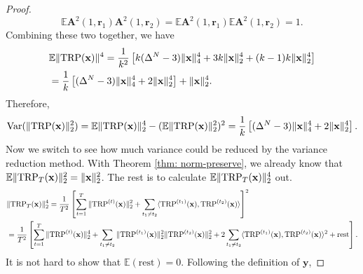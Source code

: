\begin{proof}
\[
\mathbb{E} \mathbf{A}^2(1,\mathbf{r}_1)\mathbf{A}^2(1,\mathbf{r}_2) = \mathbb{E} \mathbf{A}^2(1,\mathbf{r}_1) \mathbb{E}  \mathbf{A}^2(1,\mathbf{r}_2)  = 1.
\]
Combining these two together, we have 
\begin{equation} \label{eq:TRP_fourth_moment}
\begin{aligned}
&\mathbb{E}\|\textup{TRP}(\mathbf{x})\|^4 = \frac{1}{k^2}\left[k(\Delta^N-3)\|\mathbf{x}\|_4^4 +3k\|\mathbf{x}\|_2^4  +(k-1)k \|\mathbf{x}\|_2^4\right]\\
& =  \frac{1}{k}\left[(\Delta^N-3)\|\mathbf{x}\|_4^4 +2\|\mathbf{x}\|_2^4\right]+\|\mathbf{x}\|_2^4.  
\end{aligned}
\end{equation}
Therefore, 
\[
\textrm{Var}(\|\textup{TRP}(\mathbf{x})\|^2_2) = \mathbb{E}\|\textup{TRP}(\mathbf{x})\|^4_2 -  (\mathbb{E}\|\textup{TRP}(\mathbf{x})\|^2_2)^2 = \frac{1}{k}\left[(\Delta^N-3)\|\mathbf{x}\|_4^4 +2\|\mathbf{x}\|_2^4\right].
\]
Now we switch to see how much variance could be reduced by the variance reduction method. With Theorem \ref{thm: norm-preserve}, we already know that $\mathbb{E} \|\textup{TRP}_T(\mathbf{x})\|^2_2= \|\mathbf{x}\|_2^2$. The rest is to calculate $\mathbb{E} \|\textup{TRP}_T(\mathbf{x})\|^4_2$ out.
\begin{equation}
\begin{aligned}
&\|\textup{TRP}_T(\mathbf{x})\|^4_2 = \frac{1}{T^2}\left[\sum_{t=1}^T \|\textup{TRP}^{(t)}(\mathbf{x})\|^2_2+\sum_{t_1 \neq t_2} \langle \textup{TRP}^{(t_1)}(\mathbf{x}), \textup{TRP}^{(t_2)}(\mathbf{x}) \rangle \right]^2\\
&= \frac{1}{T^2} \left[ \sum_{t=1}^T \|\textup{TRP}^{(t)}(\mathbf{x})\|^4_2+\sum_{t_1\neq t_2}\|\textup{TRP}^{(t_1)}(\mathbf{x})\|^2_2\|\textup{TRP}^{(t_2)}(\mathbf{x})\|^2_2 +2\sum_{t_1\neq t_2}\langle \textup{TRP}^{(t_1)}(\mathbf{x}), \textup{TRP}^{(t_2)}(\mathbf{x}) \rangle^2 +\text{rest} \right].\nonumber 
\end{aligned}
\end{equation}
It is not hard to show that $\mathbb{E}(\text{rest}) = 0$. Following the definition of $\mathbf{y}$, 


\end{proof}
